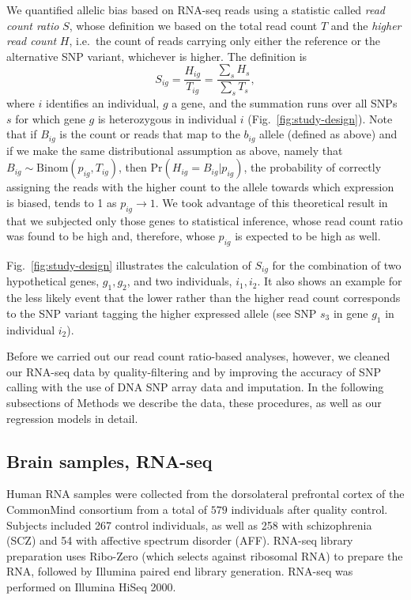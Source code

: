 \documentclass[letterpaper]{article}
\begin{document}
We quantified allelic bias based on RNA-seq reads using a statistic called
\emph{read count ratio} \(S\), whose definition we
based on the total read count \(T\) and the \emph{higher read count} \(H\),
i.e.~the count of reads carrying only either the reference or the alternative SNP variant,
whichever is higher.  The
definition is
\begin{equation}
S_{ig} = \frac{H_{ig}}{T_{ig}}= \frac{\sum_s H_s}{\sum_sT_s},
\label{eq:S-definition}
\end{equation}
where \(i\) identifies an individual, \(g\) a gene, and the summation runs
over all SNPs \(s\) for which gene \(g\) is heterozygous in individual \(i\) (Fig.~\ref{fig:study-design}).
Note that if \(B_{ig}\) is the count or reads that map to the \(b_{ig}\) allele
(defined as above) and if we make the same distributional assumption as above, namely that \(B_{ig}\sim
\mathrm{Binom}(p_{ig}, T_{ig})\), then \(\mathrm{Pr}(H_{ig}=B_{ig}|p_{ig})\), the probability of correctly
assigning the reads with the higher count to the allele towards which
expression is biased, tends to 1 as \(p_{ig} \rightarrow 1\).  We took
advantage of this theoretical result in that we subjected only those genes to
statistical inference, whose read count ratio was found to be high and,
therefore, whose \(p_{ig}\) is expected to be high as well.

Fig.~\ref{fig:study-design} illustrates the calculation of \(S_{ig}\) for the
combination of two hypothetical genes, \(g_1,g_2\), and two individuals,
\(i_1,i_2\).  It also shows an example for the less likely event that the lower rather
than the higher read count corresponds to the SNP variant tagging the higher
expressed allele (see SNP \(s_3\) in gene \(g_1\) in individual \(i_2\)).

Before we carried out our read count ratio-based analyses, however, we cleaned
our RNA-seq data by quality-filtering and by improving the accuracy of SNP
calling with the use of DNA SNP array data and imputation. In the following
subsections of Methods we describe the data, these procedures, as well as our
regression models in detail.

\subsection{Brain samples, RNA-seq}

Human RNA samples were collected from the dorsolateral prefrontal cortex of
the CommonMind consortium from a total of \(579\) individuals after
quality control. Subjects included 267 control individuals, as well as 258
with schizophrenia (SCZ) and 54 with affective spectrum disorder (AFF).
RNA-seq library preparation uses Ribo-Zero (which selects against ribosomal
RNA) to prepare the RNA, followed by Illumina paired end library generation.
RNA-seq was performed on Illumina HiSeq 2000.
\end{document}
